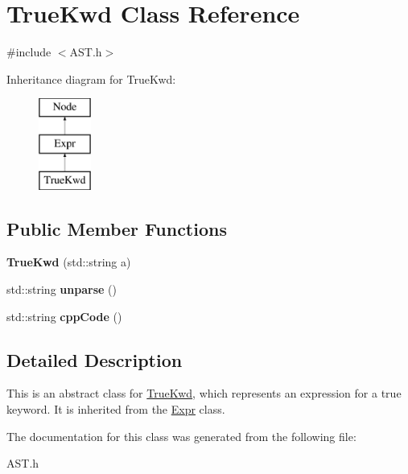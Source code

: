 \hypertarget{class_true_kwd}{}\section{True\+Kwd Class Reference}
\label{class_true_kwd}


{\ttfamily \#include $<$A\+S\+T.\+h$>$}

Inheritance diagram for True\+Kwd\+:\begin{figure}[H]
\begin{center}
\leavevmode
\includegraphics[height=3.000000cm]{class_true_kwd}
\end{center}
\end{figure}
\subsection*{Public Member Functions}
\begin{DoxyCompactItemize}
\item 
\hypertarget{class_true_kwd_aa6483baaa3815771155cbc293d2e02ea}{}{\bfseries True\+Kwd} (std\+::string a)\label{class_true_kwd_aa6483baaa3815771155cbc293d2e02ea}

\item 
\hypertarget{class_true_kwd_a5601f3b80b4b4a7779771000be41920e}{}std\+::string {\bfseries unparse} ()\label{class_true_kwd_a5601f3b80b4b4a7779771000be41920e}

\item 
\hypertarget{class_true_kwd_abaec44d4638c3c1c8b5c104ec796b3ed}{}std\+::string {\bfseries cpp\+Code} ()\label{class_true_kwd_abaec44d4638c3c1c8b5c104ec796b3ed}

\end{DoxyCompactItemize}


\subsection{Detailed Description}
This is an abstract class for \hyperlink{class_true_kwd}{True\+Kwd}, which represents an expression for a true keyword. It is inherited from the \hyperlink{class_expr}{Expr} class. 

The documentation for this class was generated from the following file\+:\begin{DoxyCompactItemize}
\item 
A\+S\+T.\+h\end{DoxyCompactItemize}
